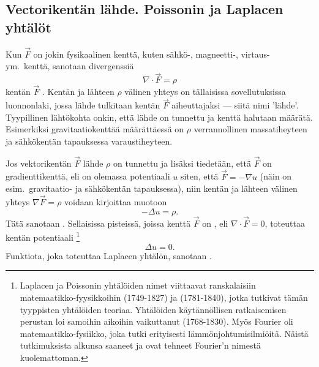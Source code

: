 \subsection{Vectorikentän lähde. Poissonin ja Laplacen yhtälöt}

Kun $\vec F$ on jokin fysikaalinen kenttä, kuten sähkö-, magneetti-, virtaus- ym.\ kenttä, 
sanotaan divergenssiä
\[
\nabla\cdot\vec F=\rho
\]
%
kentän $\vec F$ . Kentän ja lähteen $\rho$ välinen yhteys on tällaisissa 
sovellutuksissa luonnonlaki, jossa lähde tulkitaan kentän $\vec F$ aiheuttajaksi --- siitä nimi
'lähde'. Tyypillinen lähtökohta onkin, että lähde on tunnettu ja kenttä halutaan määrätä. 
Esimerkiksi gravitaatiokenttää määrättäessä on $\rho$ verrannollinen massatiheyteen ja 
sähkökentän tapauksessa varaustiheyteen.

Jos vektorikentän $\vec F$ lähde $\rho$ on tunnettu ja lisäksi tiedetään, että $\vec F$ on 
gradienttikenttä, eli on olemassa potentiaali $u$ siten, että $\vec F = -\nabla u$ 
(näin on esim.\ gravitaatio- ja sähkökentän tapauksessa), niin kentän ja lähteen välinen yhteys
$\nabla\vec F=\rho$ voidaan kirjoittaa muotoon
\[
-\Delta u=\rho.
\]
%
Tätä sanotaan . Sellaisissa pisteissä, joissa kenttä $\vec F$ on 
, eli $\nabla\cdot\vec F=0$, toteuttaa kentän potentiaali
% 
\footnote[2]{Laplacen ja Poissonin yhtälöiden nimet viittaavat 
ranskalaisiin matemaatikko-fyysikkoihin  (1749-1827) ja 
 (1781-1840), jotka tutkivat tämän tyyppisten yhtälöiden teoriaa. Yhtälöiden
käytännöllisen ratkaisemisen perustan loi samoihin aikoihin vaikuttanut  
(1768-1830). Myös Fourier oli matemaatikko-fysiikko, joka tutki erityisesti 
lämmönjohtumisilmiöitä. Näistä tutkimuksista alkunsa saaneet  ja 
 ovat tehneet Fourier'n nimestä kuolemattoman.
   }
\[
\Delta u=0.
\]
%
Funktiota, joka toteuttaa Laplacen yhtälön, sanotaan .
 
